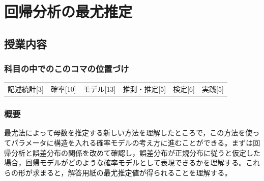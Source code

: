 \section{回帰分析の最尤推定}
\label{s24_maximum_likelihood}

\subsection{授業内容}
\subsubsection{科目の中でのこのコマの位置づけ}
\begin{tabular}[t]{cccccc}
	記述統計[3] & 確率[10] & モデル[13] & 推測・推定[5] & 検定[6] & 実践[5]
\end{tabular}

\subsubsection{概要}
最尤法によって母数を推定する新しい方法を理解したところで，この方法を使ってパラメータに構造を入れる確率モデルの考え方に進むことができる。まずは回帰分析と誤差分布の関係を改めて確認し，誤差分布が正規分布に従うと仮定した場合，回帰モデルがどのような確率モデルとして表現できるかを理解する。これらの形が求まると，解答用紙の最尤推定値が得られることを理解する。
